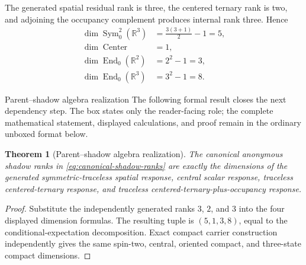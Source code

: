 \documentclass[11pt]{article}
\numberwithin{equation}{section}
\newtheorem{theorem}[definition]{Theorem}
\theoremstyle{remark}
\newcommand{\R}{\mathbb{R}}
\begin{document}
The generated spatial residual rank is three, the centered ternary rank is two, and adjoining the occupancy complement produces internal rank three. Hence
\begin{align}
\dim\operatorname{Sym}^2_0(\R^3)&=\frac{3(3+1)}2-1=5,\\
\dim\operatorname{Center}&=1,\\
\dim\operatorname{End}_0(\R^2)&=2^2-1=3,\\
\dim\operatorname{End}_0(\R^3)&=3^2-1=8.
\end{align}

\begin{proofguide}{Parent--shadow algebra realization}
The following formal result closes the next dependency step. The box states only the reader-facing role; the complete mathematical statement, displayed calculations, and proof remain in the ordinary unboxed format below.
\end{proofguide}
\begin{theorem}[Parent--shadow algebra realization]
The canonical anonymous shadow ranks in \eqref{eq:canonical-shadow-ranks} are exactly the dimensions of the generated symmetric-traceless spatial response, central scalar response, traceless centered-ternary response, and traceless centered-ternary-plus-occupancy response.
\end{theorem}
\begin{proof}
Substitute the independently generated ranks $3$, $2$, and $3$ into the four displayed dimension formulas. The resulting tuple is $(5,1,3,8)$, equal to the conditional-expectation decomposition. Exact compact carrier construction independently gives the same spin-two, central, oriented compact, and three-state compact dimensions.
\end{proof}
\end{document}
